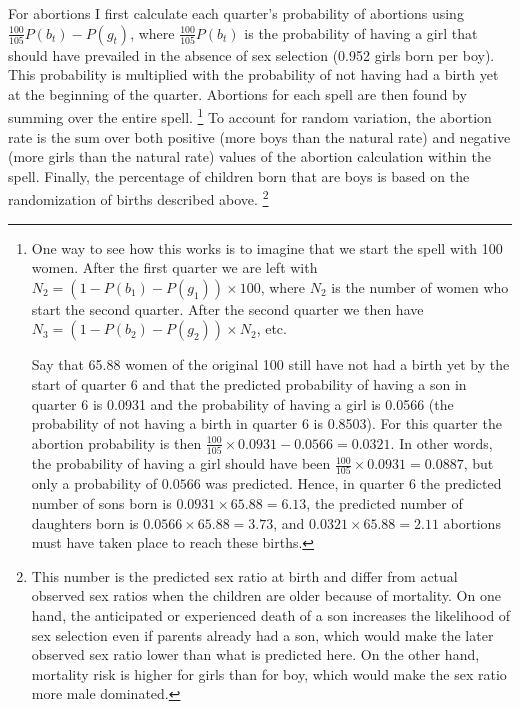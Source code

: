 \documentclass[12pt,letterpaper]{article}
\begin{document}
For abortions I first calculate each quarter's probability of abortions using
$\frac{100}{105}P(b_t)-P(g_t)$,
where $\frac{100}{105}P(b_t)$ is the probability of having a girl that should have 
prevailed in the absence of sex selection (0.952 girls born per boy).
This probability is multiplied with the probability of not having had a birth yet at 
the beginning of the quarter.
Abortions for each spell are then found by summing over the entire spell.%
\footnote{
One way to see how this works is to imagine that we start the spell with 100 women.
After the first quarter we are left with $N_2 = (1-P(b_1)-P(g_1)) \times 100$, where
$N_2$ is the number of women who start the second quarter. 
After the second quarter we then have $N_3 = (1-P(b_2)-P(g_2)) \times N_2$, etc.

Say that 65.88 women of the original 100 still have not had a birth yet by the start
of quarter 6 and that the predicted probability of having a son in quarter 6 is 0.0931 and 
the probability of having a girl is 0.0566 (the probability of not having a birth in 
quarter 6 is 0.8503).
For this quarter the abortion probability is then 
$\frac{100}{105}\times 0.0931 - 0.0566 = 0.0321$.
In other words, the probability of having a girl should have been 
$\frac{100}{105}\times 0.0931 = 0.0887$, but only a probability of $0.0566$ was 
predicted.
Hence, in quarter 6 the predicted number of sons born is $ 0.0931 \times 65.88 = 6.13$, 
the predicted number of daughters born is $ 0.0566 \times 65.88 = 3.73$, and 
$0.0321 \times 65.88 = 2.11$ abortions must have taken place to reach these births.
}
To account for random variation, the abortion rate is the sum over both positive 
(more boys than the natural rate) and negative (more girls than the natural
rate) values of the abortion calculation within the spell.
Finally, the percentage of children born that are boys is based on the randomization of
births described above.%
\footnote{
This number is the predicted sex ratio at birth and differ from actual observed sex 
ratios when the children are older because of mortality.
On one hand, the anticipated or experienced death of a son increases the likelihood
of sex selection even if parents already had a son, which would make the later observed 
sex ratio lower than what is predicted here. 
On the other hand, mortality risk is higher for girls than for boy, which would make
the sex ratio more male dominated.
}
\end{document}
